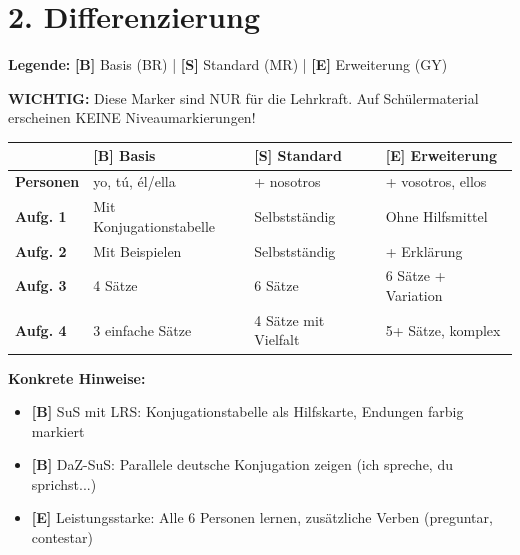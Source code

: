 \documentclass[11pt, a4paper]{article}
\newcommand{\B}{\textcolor{basis}{\textbf{[B]}}}
\newcommand{\Std}{\textcolor{standard}{\textbf{[S]}}}
\newcommand{\E}{\textcolor{erweiterung}{\textbf{[E]}}}
\begin{document}

\section*{2. Differenzierung}

\begin{differenzierung}
\textbf{Legende:} \B{} Basis (BR) | \Std{} Standard (MR) | \E{} Erweiterung (GY)

\vspace{0.5em}

\textbf{WICHTIG:} Diese Marker sind NUR für die Lehrkraft. Auf Schülermaterial erscheinen KEINE Niveaumarkierungen!
\end{differenzierung}

\vspace{1em}

\begin{tabularx}{\textwidth}{|l|X|X|X|}
\hline
& \B{} \textbf{Basis} & \Std{} \textbf{Standard} & \E{} \textbf{Erweiterung} \\
\hline
\textbf{Personen} & yo, tú, él/ella & + nosotros & + vosotros, ellos \\
\hline
\textbf{Aufg. 1} & Mit Konjugationstabelle & Selbstständig & Ohne Hilfsmittel \\
\hline
\textbf{Aufg. 2} & Mit Beispielen & Selbstständig & + Erklärung \\
\hline
\textbf{Aufg. 3} & 4 Sätze & 6 Sätze & 6 Sätze + Variation \\
\hline
\textbf{Aufg. 4} & 3 einfache Sätze & 4 Sätze mit Vielfalt & 5+ Sätze, komplex \\
\hline
\end{tabularx}

\vspace{1em}

\textbf{Konkrete Hinweise:}
\begin{itemize}
    \item \B{} SuS mit LRS: Konjugationstabelle als Hilfskarte, Endungen farbig markiert
    \item \B{} DaZ-SuS: Parallele deutsche Konjugation zeigen (ich spreche, du sprichst...)
    \item \E{} Leistungsstarke: Alle 6 Personen lernen, zusätzliche Verben (preguntar, contestar)
\end{itemize}
\end{document}

